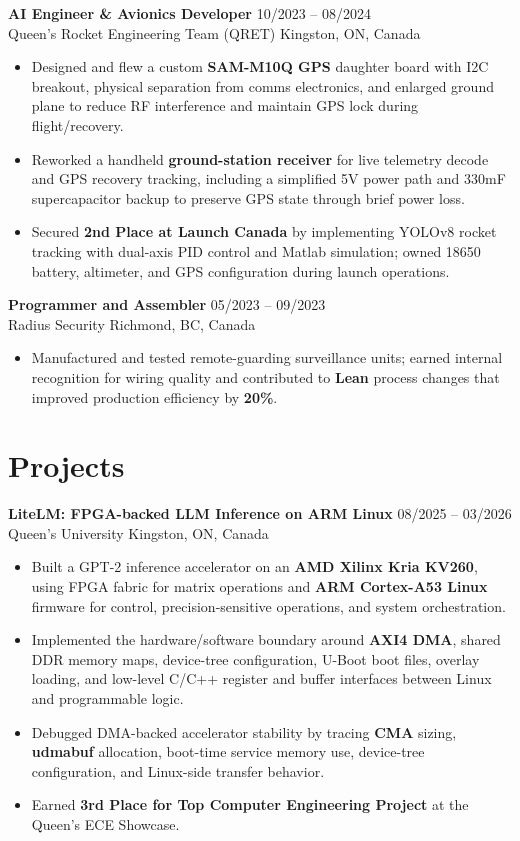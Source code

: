\documentclass[letterpaper,10pt]{article}
\begin{document}
    \noindent \textbf{AI Engineer \& Avionics Developer} \hfill 10/2023 -- 08/2024 \\
    Queen's Rocket Engineering Team (QRET) \hfill Kingston, ON, Canada
    \begin{itemize}
        \item Designed and flew a custom \textbf{SAM-M10Q GPS} daughter board with I2C breakout, physical separation from comms electronics, and enlarged ground plane to reduce RF interference and maintain GPS lock during flight/recovery.
        \item Reworked a handheld \textbf{ground-station receiver} for live telemetry decode and GPS recovery tracking, including a simplified 5V power path and 330mF supercapacitor backup to preserve GPS state through brief power loss.
        \item Secured \textbf{2nd Place at Launch Canada} by implementing YOLOv8 rocket tracking with dual-axis PID control and Matlab simulation; owned 18650 battery, altimeter, and GPS configuration during launch operations.
    \end{itemize}

    \noindent \textbf{Programmer and Assembler} \hfill 05/2023 -- 09/2023 \\
    Radius Security \hfill Richmond, BC, Canada
    \begin{itemize}
        \item Manufactured and tested remote-guarding surveillance units; earned internal recognition for wiring quality and contributed to \textbf{Lean} process changes that improved production efficiency by \textbf{20\%}.
    \end{itemize}

    \section{Projects}
    \noindent \textbf{LiteLM: FPGA-backed LLM Inference on ARM Linux} \hfill 08/2025 -- 03/2026 \\
    Queen's University \hfill Kingston, ON, Canada
    \begin{itemize}
        \item Built a GPT-2 inference accelerator on an \textbf{AMD Xilinx Kria KV260}, using FPGA fabric for matrix operations and \textbf{ARM Cortex-A53 Linux} firmware for control, precision-sensitive operations, and system orchestration.
        \item Implemented the hardware/software boundary around \textbf{AXI4 DMA}, shared DDR memory maps, device-tree configuration, U-Boot boot files, overlay loading, and low-level C/C++ register and buffer interfaces between Linux and programmable logic.
        \item Debugged DMA-backed accelerator stability by tracing \textbf{CMA} sizing, \textbf{udmabuf} allocation, boot-time service memory use, device-tree configuration, and Linux-side transfer behavior.
        \item Earned \textbf{3rd Place for Top Computer Engineering Project} at the Queen's ECE Showcase.
    \end{itemize}
\end{document}
